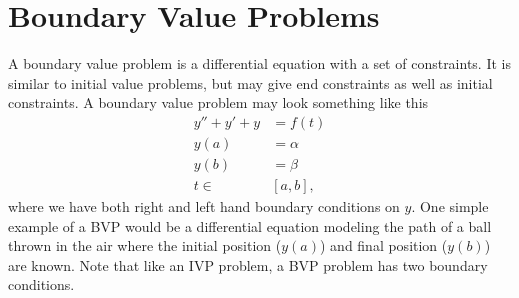 \section*{Boundary Value Problems}
A boundary value problem is a differential equation with a set of constraints.
It is similar to initial value problems, but may give end constraints as well as initial constraints.
A boundary value problem may look something like this
\begin{align*}
    y'' + y' + y &= f(t) \\
    y(a) &= \alpha \\
    y(b) &= \beta \\
    t\in &[a,b],
\end{align*}
where we have both right and left hand boundary conditions on $y$.
One simple example of a BVP would be a differential equation modeling the path of a ball thrown in the air where the initial position ($y(a)$) and final position ($y(b)$) are known. Note that like an IVP problem, a BVP problem has two boundary conditions.

